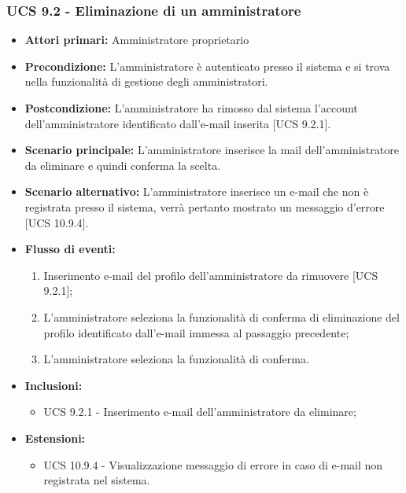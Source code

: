 \subsubsection{UCS 9.2 - Eliminazione di un amministratore}%

\begin{itemize}
\item \textbf{Attori primari:} Amministratore proprietario
\item \textbf{Precondizione:} L'amministratore è autenticato presso il sistema e si trova nella funzionalità di gestione degli amministratori.
\item \textbf{Postcondizione:} L'amministratore ha rimosso dal sistema l'account dell'amministratore identificato dall'e-mail inserita [UCS 9.2.1].
\item \textbf{Scenario principale:} L'amministratore inserisce la mail dell'amministratore da eliminare e quindi conferma la scelta.
\item \textbf{Scenario alternativo:} L'amministratore inserisce un e-mail che non è registrata presso il sistema, verrà pertanto mostrato un messaggio d'errore [UCS 10.9.4].
\item \textbf{Flusso di eventi:} %
  \begin{enumerate}
        \item Inserimento e-mail del profilo dell'amministratore da rimuovere [UCS 9.2.1];
        \item L'amministratore seleziona la funzionalità di conferma di eliminazione del profilo identificato dall'e-mail immessa al passaggio precedente;
        \item L'amministratore seleziona la funzionalità di conferma.
    \end{enumerate}
    \item \textbf{Inclusioni:}
	\begin{itemize}
		\item UCS 9.2.1 - Inserimento e-mail dell'amministratore da eliminare;
	\end{itemize}
\item \textbf{Estensioni:}
	\begin{itemize}
		\item UCS 10.9.4 - Visualizzazione messaggio di errore in caso di e-mail non registrata nel sistema.
	\end{itemize}
\end{itemize}

